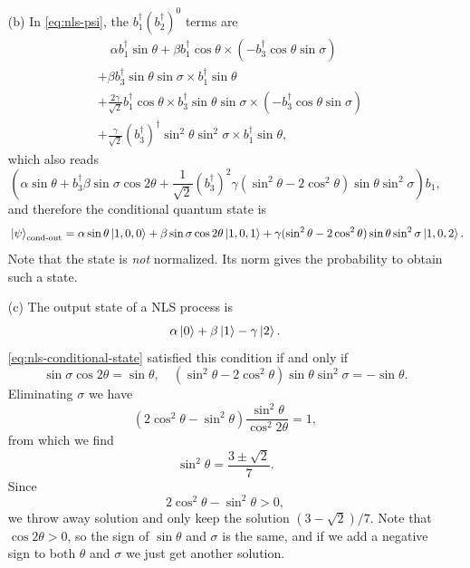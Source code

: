 \documentclass[hyperref, a4paper]{article}
\begin{document}
\begin{itemize}
\begin{equation}
        \label{eq:nls-psi}
    \end{equation}
    \item[(b)] In \eqref{eq:nls-psi}, the $b_1^\dagger (b_2^\dagger)^0$ terms are
    \[
        \begin{aligned}
            &\quad \alpha b_1^\dagger \sin \theta + \beta b_1^\dagger \cos \theta \times (-b_3^\dagger \cos \theta \sin \sigma) \\
            &+ \beta b_3^\dagger \sin \theta \sin \sigma \times b_1^\dagger \sin \theta \\
            &+ \frac{2 \gamma}{\sqrt{2}} b_1^\dagger \cos \theta \times b_3^\dagger \sin \theta \sin \sigma\times (- b_3^\dagger \cos \theta \sin \sigma) \\
            &+ \frac{\gamma}{\sqrt{2}} (b_3^\dagger)^\dagger \sin^2\theta \sin^2\sigma \times b_1^\dagger \sin \theta,
        \end{aligned}
    \]  
    which also reads 
    \[
        (\alpha \sin\theta + b_3^\dagger \beta \sin\sigma \cos 2 \theta + \frac{1}{\sqrt{2}} (b_3^\dagger)^2 \gamma (\sin^2\theta - 2\cos^2\theta) \sin \theta \sin^2 \sigma) b_1,
    \]
    and therefore the conditional quantum state is 
    \begin{equation}
        \ket*{\psi}_\text{cond-out} = \alpha \sin\theta \ket*{1, 0, 0} + \beta \sin\sigma \cos 2 \theta \ket*{1, 0, 1} + \gamma (\sin^2\theta - 2\cos^2\theta) \sin \theta \sin^2 \sigma \ket*{1, 0, 2}.
        \label{eq:nls-conditional-state}
    \end{equation}
    Note that the state is \emph{not} normalized. Its norm gives the probability to obtain such a state.
    \item[(c)] The output state of a NLS process is 
    \[
        \alpha \ket*{0} + \beta \ket*{1} - \gamma \ket*{2}.
    \] 
    \eqref{eq:nls-conditional-state} satisfied this condition if and only if 
    \[
        \sin \sigma \cos 2 \theta = \sin \theta, \quad (\sin^2\theta - 2\cos^2\theta) \sin \theta \sin^2 \sigma = - \sin \theta.
    \]
    Eliminating $\sigma$ we have 
    \[
        (2 \cos^2 \theta - \sin^2 \theta) \frac{\sin^2 \theta}{\cos^2 2 \theta} = 1,
    \]
    from which we find
    \[
        \sin^2 \theta = \frac{3 \pm \sqrt{2}}{7}.
    \]
    Since 
    \[
        2 \cos^2 \theta - \sin^2 \theta > 0,
    \]
    we throw away solution and only keep the solution $(3 - \sqrt{2}) / 7$. 
    Note that $\cos 2 \theta >0$, so the sign of $\sin \theta$ and $\sigma$ is the same, and if we add a negative sign to both $\theta$ and $\sigma$ we just get another solution.

\end{itemize}
\end{document}
